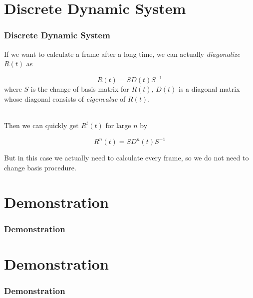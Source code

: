 \documentclass[12pt, t]{beamer}
\renewcommand{\emph}[1]{{\color{Turquoise3}\textsl{#1}}}
\newcommand{\nullspace}{~\\[15pt]}
\begin{document}

\section{Discrete Dynamic System}
\begin{frame}
    \frametitle{Discrete Dynamic System}

    If we want to calculate a frame after a long time, we can actually \emph{diagonalize} $R(t)$
    as

    \begin{equation*}
        R(t) = S D(t) S^{-1}
    \end{equation*}
    where $S$ is the change of basis matrix for $R(t)$, $D(t)$ is a diagonal matrix whose diagonal
    consists of \emph{eigenvalue} of $R(t)$.

    \nullspace
    Then we can quickly get $R^t(t)$ for large $n$ by

    \begin{equation*}
        R^n(t) = SD^n(t)S^{-1}
    \end{equation*}

    But in this case we actually need to calculate every frame,
    so we do not need to change basis procedure.

\end{frame}


\section{Demonstration}
\begin{frame}
    \frametitle{Demonstration}

    \begin{center}
    \end{center}


\end{frame}


\section{Demonstration}
\begin{frame}
    \frametitle{Demonstration}

    \begin{center}
    \end{center}

\end{frame}
\end{document}
